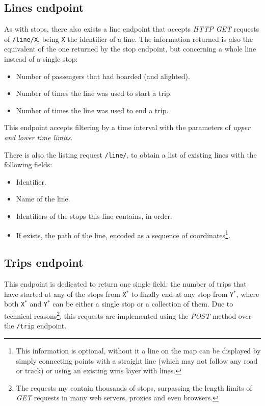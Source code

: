     \subsection{Lines endpoint}
    As with stops, there also exists a line endpoint that accepts {\em HTTP GET} requests of \texttt{/line/X}, being \texttt{X} the identifier of a line. The information returned is also the equivalent of the one returned by the stop endpoint, but concerning a whole line instead of a single stop:
    
    \begin{itemize}
        \item Number of passengers that had boarded (and alighted).
        \item Number of times the line was used to start a trip.
        \item Number of times the line was used to end a trip.
    \end{itemize}
    
    This endpoint accepts filtering by a time interval with the parameters of \textit{upper and lower time limits}.
    
    There is also the listing request \texttt{/line/}, to obtain a list of existing lines with the following fields:
    
    \begin{itemize}
        \item Identifier.
        \item Name of the line.
        \item Identifiers of the stops this line contains, in order.
        \item If exists, the path of the line, encoded as a sequence of coordinates\footnote{This information is optional, without it a line on the map can be displayed by simply connecting points with a straight line (which may not follow any road or track) or using an existing \gls{wms} layer with lines.}.
    \end{itemize}
    
    \subsection{Trips endpoint}
    This endpoint is dedicated to return one single field: the number of trips that have started at any of the stops from \texttt{X$^*$} to finally end at any stop from \texttt{Y$^*$}, where both \texttt{X$^*$} and \texttt{Y$^*$} can be either a single stop or a collection of them. Due to technical reasons\footnote{The requests my contain thousands of stops, surpassing the length limits of {\em GET} requests in many web servers, proxies and even browsers.}, this requests are implemented using the {\em POST} method over the \texttt{/trip} endpoint.
    
